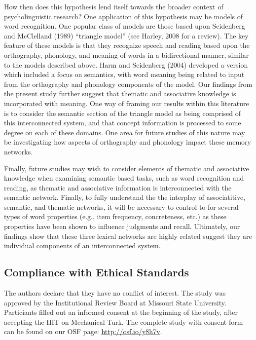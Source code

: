 \documentclass[english,,man]{apa6}
\begin{document}
How then does this hypothesis lend itself towards the broader context of
psycholinguistic research? One application of this hypothesis may be
models of word recognition. One popular class of models are those based
upon Seidenberg and McClelland (1989) \enquote{triangle model} (see
Harley, 2008 for a review). The key feature of these models is that they
recognize speech and reading based upon the orthography, phonology, and
meaning of words in a bidirectional manner, similar to the models
described above. Harm and Seidenberg (2004) developed a version which
included a focus on semantics, with word meaning being related to input
from the orthography and phonology components of the model. Our findings
from the present study further suggest that thematic and associative
knowledge is incorporated with meaning. One way of framing our results
within this literature is to consider the semantic section of the
triangle model as being comprised of this interconnected system, and
that concept information is processed to some degree on each of these
domains. One area for future studies of this nature may be investigating
how aspects of orthography and phonology impact these memory networks.

Finally, future studies may wish to consider elements of thematic and
associative knowledge when examining semantic based tasks, such as word
recognition and reading, as thematic and associative information is
interconnected with the semantic network. Finally, to fully understand
the the interplay of associatitive, semantic, and thematic networks, it
will be necessary to control to for several types of word properties
(e.g., item frequency, concreteness, etc.) as these properties have been
shown to influence judgments and recall. Ultimately, our findings show
that these three lexical networks are highly related suggest they are
individual components of an interconnected system.

\subsection{Compliance with Ethical
Standards}\label{compliance-with-ethical-standards}

The authors declare that they have no conflict of interest. The study
was approved by the Institutional Review Board at Missouri State
University. Particiants filled out an informed consent at the beginning
of the study, after accepting the HIT on Mechanical Turk. The complete
study with consent form can be found on our OSF page:
\url{http://osf.io/y8h7v}.
\end{document}
